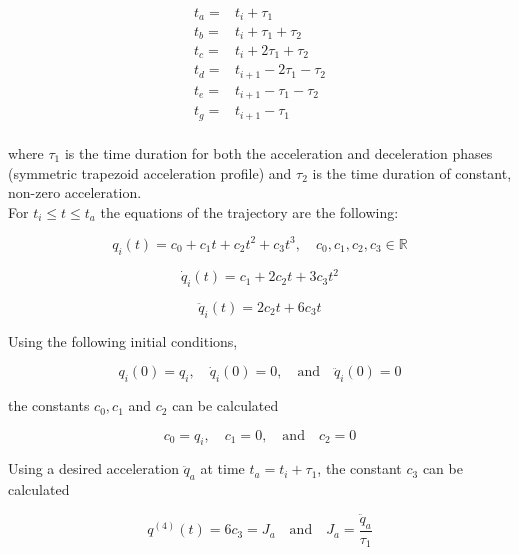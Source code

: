 \begin{equation}
\begin{aligned}
t_a ={}& t_i + τ_1 \\
t_b ={}& t_i + τ_1 + τ_2 \\
t_c ={}& t_i + 2τ_1 + τ_2 \\
t_d ={}& t_{i+1} - 2τ_1 - τ_2 \\
t_e ={}& t_{i+1} - τ_1 - τ_2 \\
t_g ={}& t_{i+1} - τ_1 \\
\end{aligned}
\end{equation}

where $τ_1$ is the time duration for both the acceleration and deceleration phases (symmetric trapezoid acceleration profile) and $τ_2$ is the time duration of constant, non-zero acceleration. \\

For $t_i \leq t \leq t_a$ the equations of the trajectory are the following:

\begin{equation}
q_i(t) = c_0 + c_1t + c_2t^2 + c_3t^3, \quad c_0,c_1,c_2,c_3 \in \mathbb{R}
\end{equation}

\begin{equation}
\dot{q}_i(t) = c_1 + 2c_2t + 3c_3t^2
\end{equation}

\begin{equation}
\ddot{q}_i(t) = 2c_2t + 6c_3t
\end{equation}

Using the following initial conditions, 

\begin{equation}
q_i(0) = q_i, \quad \dot{q}_i(0) = 0, \quad \textrm{and} \quad \ddot{q}_i(0) = 0
\end{equation}

the constants $c_0,c_1$ and $c_2$ can be calculated

\begin{equation}
c_0 = q_i, \quad c_1 = 0, \quad \textrm{and} \quad c_2 = 0
\end{equation}

Using a desired acceleration $\ddot{q}_a$ at time $t_a = t_i + τ_1$, the constant $c_3$ can be calculated

\begin{equation}
q^{(4)}(t) = 6c_3 = J_a \quad \textrm{and} \quad J_a = \frac{\ddot{q}_a}{τ_1}
\end{equation}

